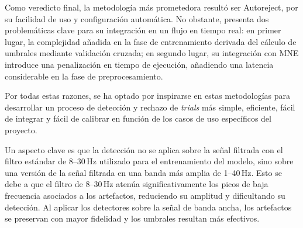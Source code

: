 Como veredicto final, la metodología más prometedora resultó ser Autoreject, por su facilidad de uso y configuración automática. No obstante, presenta dos problemáticas clave para su integración en un flujo en tiempo real: en primer lugar, la complejidad añadida en la fase de entrenamiento derivada del cálculo de umbrales mediante validación cruzada; en segundo lugar, su integración con MNE introduce una penalización en tiempo de ejecución, añadiendo una latencia considerable en la fase de preprocesamiento.

Por todas estas razones, se ha optado por inspirarse en estas metodologías para desarrollar un proceso de detección y rechazo de \textit{trials} más simple, eficiente, fácil de integrar y fácil de calibrar en función de los casos de uso específicos del proyecto.

Un aspecto clave es que la detección no se aplica sobre la señal filtrada con el filtro estándar de 8--30\,Hz utilizado para el entrenamiento del modelo, sino sobre una versión de la señal filtrada en una banda más amplia de 1--40\,Hz. Esto se debe a que el filtro de 8--30\,Hz atenúa significativamente los picos de baja frecuencia asociados a los artefactos, reduciendo su amplitud y dificultando su detección. Al aplicar los detectores sobre la señal de banda ancha, los artefactos se preservan con mayor fidelidad y los umbrales resultan más efectivos.

